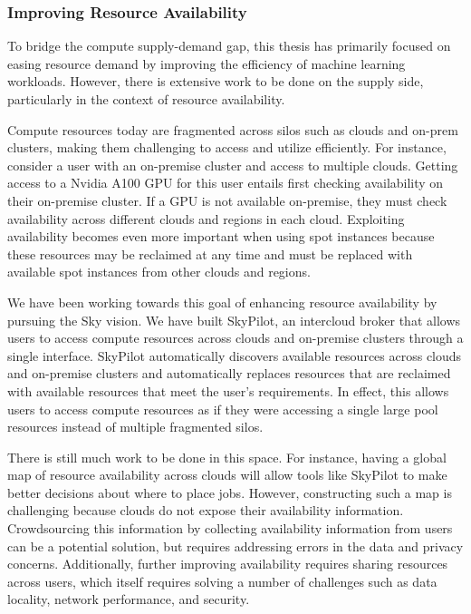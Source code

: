 \subsubsection{Improving Resource Availability}
To bridge the compute supply-demand gap, this thesis has primarily focused on easing resource demand by improving the efficiency of machine learning workloads. However, there is extensive work to be done on the supply side, particularly in the context of resource availability.

Compute resources today are fragmented across silos such as clouds and on-prem clusters, making them challenging to access and utilize efficiently. For instance, consider a user with an on-premise cluster and access to multiple clouds. Getting access to a Nvidia A100 GPU for this user entails first checking availability on their on-premise cluster. If a GPU is not available on-premise, they must check availability across different clouds and regions in each cloud. Exploiting availability becomes even more important when using spot instances because these resources may be reclaimed at any time and must be replaced with available spot instances from other clouds and regions.

We have been working towards this goal of enhancing resource availability by pursuing the Sky\cite{skyhotos} vision. We have built SkyPilot\cite{skypilot}, an intercloud broker that allows users to access compute resources across clouds and on-premise clusters through a single interface. SkyPilot automatically discovers available resources across clouds and on-premise clusters and automatically replaces resources that are reclaimed with available resources that meet the user's requirements. In effect, this allows users to access compute resources as if they were accessing a single large pool resources instead of multiple fragmented silos.

There is still much work to be done in this space. For instance, having a global map of resource availability across clouds will allow tools like SkyPilot to make better decisions about where to place jobs. However, constructing such a map is challenging because clouds do not expose their availability information. Crowdsourcing this information by collecting availability information from users can be a potential solution, but requires addressing errors in the data and privacy concerns. Additionally, further improving availability requires sharing resources across users, which itself requires solving a number of challenges such as data locality, network performance, and security.


